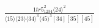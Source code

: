 \documentclass[varwidth, border=5pt]{standalone}
\begin{document}
\begin{my}
$\begin{gathered}
\scriptscriptstyle\frac{1tr5_{1234}^2⟨24⟩^2}{⟨15⟩⟨23⟩⟨34⟩^3⟨45⟩^3[34][35][45]}
\end{gathered}$
\end{my}
\end{document}
